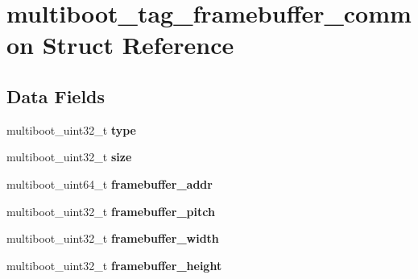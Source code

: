\hypertarget{structmultiboot__tag__framebuffer__common}{}\section{multiboot\+\_\+tag\+\_\+framebuffer\+\_\+common Struct Reference}
\label{structmultiboot__tag__framebuffer__common}
\subsection*{Data Fields}
\begin{DoxyCompactItemize}
\item 
multiboot\+\_\+uint32\+\_\+t {\bfseries type}\hypertarget{structmultiboot__tag__framebuffer__common_a614fcde325d8c11c6a1e86b4e392815f}{}\label{structmultiboot__tag__framebuffer__common_a614fcde325d8c11c6a1e86b4e392815f}

\item 
multiboot\+\_\+uint32\+\_\+t {\bfseries size}\hypertarget{structmultiboot__tag__framebuffer__common_aa8972f75c7d893a736aa00bcb5ad905a}{}\label{structmultiboot__tag__framebuffer__common_aa8972f75c7d893a736aa00bcb5ad905a}

\item 
multiboot\+\_\+uint64\+\_\+t {\bfseries framebuffer\+\_\+addr}\hypertarget{structmultiboot__tag__framebuffer__common_a82d2ddfc7184652095c8359a60dc1b31}{}\label{structmultiboot__tag__framebuffer__common_a82d2ddfc7184652095c8359a60dc1b31}

\item 
multiboot\+\_\+uint32\+\_\+t {\bfseries framebuffer\+\_\+pitch}\hypertarget{structmultiboot__tag__framebuffer__common_a86adb2da5c20f527ed4fbb0a2a6423bc}{}\label{structmultiboot__tag__framebuffer__common_a86adb2da5c20f527ed4fbb0a2a6423bc}

\item 
multiboot\+\_\+uint32\+\_\+t {\bfseries framebuffer\+\_\+width}\hypertarget{structmultiboot__tag__framebuffer__common_a3cfc65ce6112c0b7676341353a82e7d1}{}\label{structmultiboot__tag__framebuffer__common_a3cfc65ce6112c0b7676341353a82e7d1}

\item 
multiboot\+\_\+uint32\+\_\+t {\bfseries framebuffer\+\_\+height}\hypertarget{structmultiboot__tag__framebuffer__common_a543fb87729a64b16b113854d88063f2d}{}\label{structmultiboot__tag__framebuffer__common_a543fb87729a64b16b113854d88063f2d}


\end{DoxyCompactItemize}
